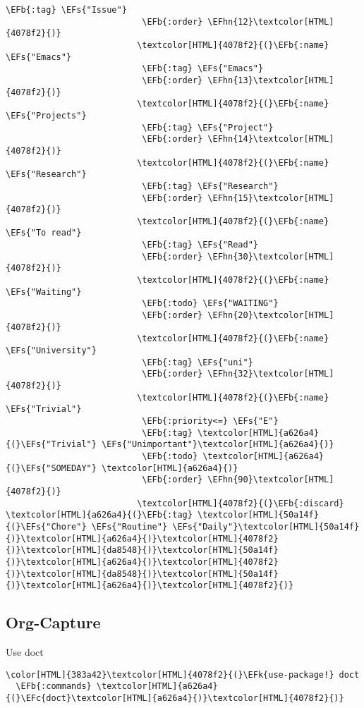 \documentclass{scrartcl}
\newcommand{\EFk}[1]{\textcolor{EFk}{#1}} %
\newcommand{\EFs}[1]{\textcolor{EFs}{#1}} %
\newcommand{\EFb}[1]{\textcolor{EFb}{#1}} %
\newcommand{\EFc}[1]{\textcolor{EFc}{#1}} %
\newcommand{\EFhn}[1]{\textcolor{EFhn}{\textbf{#1}}} %
\begin{document}
\begin{Code}
\begin{Verbatim}[]
                           \EFb{:tag} \EFs{"Issue"}
                           \EFb{:order} \EFhn{12}\textcolor[HTML]{4078f2}{)}
                          \textcolor[HTML]{4078f2}{(}\EFb{:name} \EFs{"Emacs"}
                           \EFb{:tag} \EFs{"Emacs"}
                           \EFb{:order} \EFhn{13}\textcolor[HTML]{4078f2}{)}
                          \textcolor[HTML]{4078f2}{(}\EFb{:name} \EFs{"Projects"}
                           \EFb{:tag} \EFs{"Project"}
                           \EFb{:order} \EFhn{14}\textcolor[HTML]{4078f2}{)}
                          \textcolor[HTML]{4078f2}{(}\EFb{:name} \EFs{"Research"}
                           \EFb{:tag} \EFs{"Research"}
                           \EFb{:order} \EFhn{15}\textcolor[HTML]{4078f2}{)}
                          \textcolor[HTML]{4078f2}{(}\EFb{:name} \EFs{"To read"}
                           \EFb{:tag} \EFs{"Read"}
                           \EFb{:order} \EFhn{30}\textcolor[HTML]{4078f2}{)}
                          \textcolor[HTML]{4078f2}{(}\EFb{:name} \EFs{"Waiting"}
                           \EFb{:todo} \EFs{"WAITING"}
                           \EFb{:order} \EFhn{20}\textcolor[HTML]{4078f2}{)}
                          \textcolor[HTML]{4078f2}{(}\EFb{:name} \EFs{"University"}
                           \EFb{:tag} \EFs{"uni"}
                           \EFb{:order} \EFhn{32}\textcolor[HTML]{4078f2}{)}
                          \textcolor[HTML]{4078f2}{(}\EFb{:name} \EFs{"Trivial"}
                           \EFb{:priority<=} \EFs{"E"}
                           \EFb{:tag} \textcolor[HTML]{a626a4}{(}\EFs{"Trivial"} \EFs{"Unimportant"}\textcolor[HTML]{a626a4}{)}
                           \EFb{:todo} \textcolor[HTML]{a626a4}{(}\EFs{"SOMEDAY"} \textcolor[HTML]{a626a4}{)}
                           \EFb{:order} \EFhn{90}\textcolor[HTML]{4078f2}{)}
                          \textcolor[HTML]{4078f2}{(}\EFb{:discard} \textcolor[HTML]{a626a4}{(}\EFb{:tag} \textcolor[HTML]{50a14f}{(}\EFs{"Chore"} \EFs{"Routine"} \EFs{"Daily"}\textcolor[HTML]{50a14f}{)}\textcolor[HTML]{a626a4}{)}\textcolor[HTML]{4078f2}{)}\textcolor[HTML]{da8548}{)}\textcolor[HTML]{50a14f}{)}\textcolor[HTML]{a626a4}{)}\textcolor[HTML]{4078f2}{)}\textcolor[HTML]{da8548}{)}\textcolor[HTML]{50a14f}{)}\textcolor[HTML]{a626a4}{)}\textcolor[HTML]{4078f2}{)}
\end{Verbatim}
\end{Code}

\subsection{Org-Capture}
\label{sec:org985301c}
Use doct
\begin{Code}
\begin{Verbatim}[]
\color[HTML]{383a42}\textcolor[HTML]{4078f2}{(}\EFk{use-package!} doct
  \EFb{:commands} \textcolor[HTML]{a626a4}{(}\EFc{doct}\textcolor[HTML]{a626a4}{)}\textcolor[HTML]{4078f2}{)}
\end{Verbatim}
\end{Code}
\end{document}
